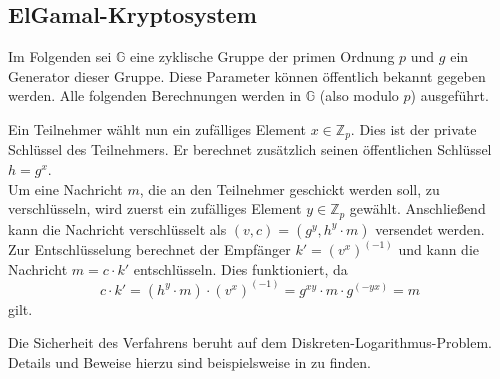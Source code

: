 \subsection{ElGamal-Kryptosystem}

\label{sec_basics_threshold_elgamal}

Im Folgenden sei \(\mathbb{G}\) eine zyklische Gruppe der primen Ordnung \(p\) und \(g\) ein Generator dieser Gruppe. Diese Parameter können öffentlich bekannt gegeben werden. Alle folgenden Berechnungen werden in \(\mathbb{G}\) (also modulo \(p\)) ausgeführt.

Ein Teilnehmer wählt nun ein zufälliges Element \(x \in \mathbb{Z}_p\). Dies ist der private Schlüssel des Teilnehmers. Er berechnet zusätzlich seinen öffentlichen Schlüssel \(h = g^x\).\\
Um eine Nachricht \(m\), die an den Teilnehmer geschickt werden soll, zu verschlüsseln, wird zuerst ein zufälliges Element \(y \in \mathbb{Z}_p\) gewählt. Anschließend kann die Nachricht verschlüsselt als \((v, c) = (g^y, h^y \cdot m)\) versendet werden.\\
Zur Entschlüsselung berechnet der Empfänger \(k' = (v^x)^{(-1)}\) und kann die Nachricht \(m = c \cdot k'\) entschlüsseln. Dies funktioniert, da 
\[c \cdot k' = (h^y \cdot m) \cdot (v^x)^{(-1)} = g^{xy} \cdot m \cdot g^{(-yx)} = m\]
gilt.

Die Sicherheit des Verfahrens beruht auf dem Diskreten-Logarithmus-Problem. Details und Beweise hierzu sind beispielsweise in \cite{katz2014} zu finden. 
